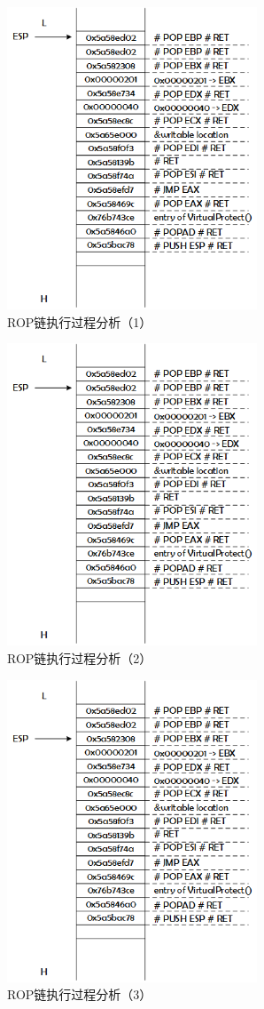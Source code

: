 \documentclass[bachelor]{thesis-uestc}
\begin{document}
\begin{figure}[htbp]
	\centering\includegraphics[height=9cm]{images/rop_chain_s1.png}
	\caption{ROP链执行过程分析（1）}
	\label{fig:rop_chain_s1}
\end{figure}

\begin{figure}[htbp]
	\centering\includegraphics[height=9cm]{images/rop_chain_s2.png}
	\caption{ROP链执行过程分析（2）}
	\label{fig:rop_chain_s2}
\end{figure}

\begin{figure}[htbp]
	\centering\includegraphics[height=9cm]{images/rop_chain_s3.png}
	\caption{ROP链执行过程分析（3）}
	\label{fig:rop_chain_s3}
\end{figure}
\end{document}
